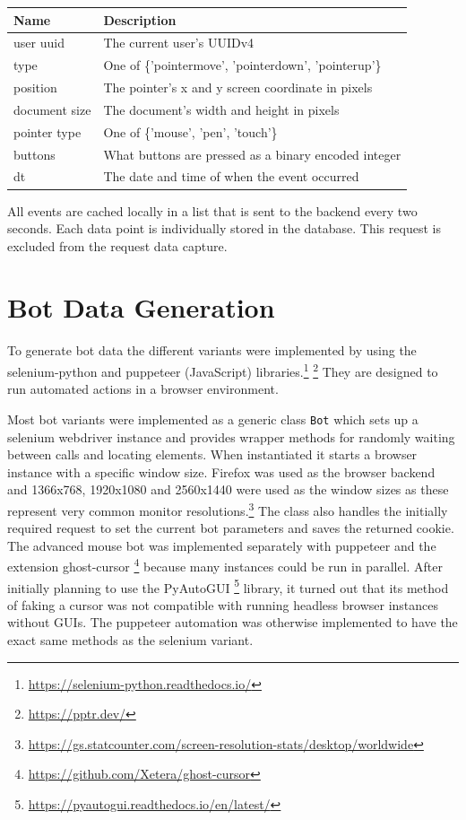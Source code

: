 \documentclass[
    fontsize=12pt,
    headings=small,
    parskip=half,           %
    bibliography=totoc,
    numbers=noenddot,       %
    open=any,               %
    final,                   %
    table
]{scrreprt}
\begin{document}
\begin{table}[H]
\begin{center}
\begin{tabular*}{\textwidth}{ll @{\extracolsep{\fill}}}
\toprule
Name & Description \\
\midrule
user uuid & The current user's UUIDv4 \\
type & One of \{'pointermove', 'pointerdown', 'pointerup'\} \\
position & The pointer's x and y screen coordinate in pixels \\
document size & The document's width and height in pixels \\
pointer type & One of \{'mouse', 'pen', 'touch'\} \\
buttons & What buttons are pressed as a binary encoded integer \\
dt & The date and time of when the event occurred \\
\bottomrule
\end{tabular*}
\end{center}
\end{table}

All events are cached locally in a list that is sent to the backend every two seconds. Each data point is individually stored in the database. This request is excluded from the request data capture.

\section{Bot Data Generation}

To generate bot data the different variants were implemented by using the selenium-python and puppeteer (JavaScript) libraries.\footnote{\url{https://selenium-python.readthedocs.io/}} \footnote{\url{https://pptr.dev/}} They are designed to run automated actions in a browser environment.

Most bot variants were implemented as a generic class \lstinline{Bot} which sets up a selenium webdriver instance and provides wrapper methods for randomly waiting between calls and locating elements. When instantiated it starts a  browser instance with a specific window size. Firefox was used as the browser backend and 1366x768, 1920x1080 and 2560x1440 were used as the window sizes as these represent very common monitor resolutions.\footnote{\url{https://gs.statcounter.com/screen-resolution-stats/desktop/worldwide}} The class also handles the initially required request to set the current bot parameters and saves the returned cookie. The advanced mouse bot was implemented separately with puppeteer and the extension ghost-cursor \footnote{\url{https://github.com/Xetera/ghost-cursor}} because many instances could be run in parallel. After initially planning to use the PyAutoGUI \footnote{\url{https://pyautogui.readthedocs.io/en/latest/}} library, it turned out that its method of faking a cursor was not compatible with running headless browser instances without GUIs. The puppeteer automation was otherwise implemented to have the exact same methods as the selenium variant.
\end{document}

